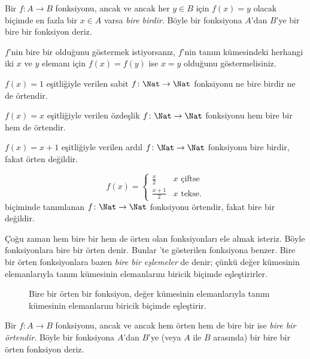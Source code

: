 \begin{defn}
Bir $f \colon A \rightarrow B$ fonksiyonu, ancak ve ancak her $y \in B$ için
$f(x)=y$ olacak biçimde en fazla bir $x \in A$ varsa \emph{bire birdir}.
Böyle bir fonksiyona $A$'dan $B$'ye bir bire bir fonksiyon deriz.
\end{defn}

\begin{explain}
$f$'nin bire bir olduğunu göstermek istiyorsanız, $f$'nin tanım kümesindeki
herhangi iki $x$ ve $y$ elemanı için $f(x)=f(y)$ ise $x=y$ olduğunu
göstermelisiniz.
\end{explain}

\begin{ex}
$f(x)=1$ eşitliğiyle verilen sabit $f\colon \Nat \to \Nat$ fonksiyonu ne
bire birdir ne de örtendir.

$f(x)=x$ eşitliğiyle verilen özdeşlik $f\colon \Nat \to \Nat$ fonksiyonu hem
bire bir hem de örtendir.

$f(x)=x+1$ eşitliğiyle verilen ardıl $f \colon \Nat \to \Nat$ fonksiyonu
bire birdir, fakat örten değildir.

\[
  f(x) =
  \begin{cases}
    \frac{x}{2} & \text{$x$ çiftse} \\
    \frac{x+1}{2} & \text{$x$ tekse.}
  \end{cases}
\]
biçiminde tanımlanan $f \colon \Nat \to \Nat$ fonksiyonu örtendir, fakat
bire bir değildir.
\end{ex}

\begin{explain}
Çoğu zaman hem bire bir hem de örten olan fonksiyonları ele almak isteriz.
Böyle fonksiyonlara bire bir örten denir. Bunlar
'te gösterilen fonksiyona benzer. Bire bir örten
fonksiyonlara bazen \emph{bire bir eşlemeler} de denir; çünkü değer kümesinin
elemanlarıyla tanım kümesinin elemanlarını biricik biçimde eşleştirirler.
\begin{figure}
  \caption{Bire bir örten bir fonksiyon, değer kümesinin elemanlarıyla tanım
    kümesinin elemanlarını biricik biçimde eşleştirir.}
\end{figure}
\end{explain}

\begin{defn}
Bir $f \colon A \to B$ fonksiyonu, ancak ve ancak hem örten hem de bire bir ise
\emph{bire bir örtendir}. Böyle bir fonksiyona $A$'dan $B$'ye (veya $A$ ile
$B$ arasında) bir bire bir örten fonksiyon deriz.
\end{defn}

